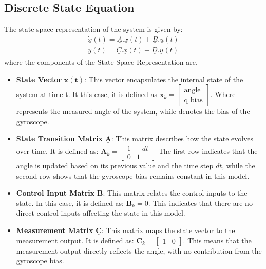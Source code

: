 \begin{appendices}
\subsection{Discrete State Equation}
The state-space representation of the system is given by:
\begin{equation}
	\begin{aligned}
		\underline{\dot{x}}(t) = \underline{A}.\underline{x}(t) + \underline{B}.\underline{u}(t) \\
		\underline{y}(t) = \underline{C}.\underline{x}(t) + \underline{D}.\underline{u}(t)  \label{eq:eq}
	\end{aligned}
\end{equation}
where the components of the State-Space Representation are,
\begin{itemize}
	\item \textbf{State Vector} $\mathbf{\underline{x}(t)}$: This vector encapsulates the internal state of the system at time t. It this case, it is defined as $\mathbf{x}_{k} = \begin{bmatrix} \text{angle} \\ \text{q\_bias} \end{bmatrix}$. Where  represents the measured angle of the system, while  denotes the bias of the gyroscope.
	
	\item \textbf{State Transition Matrix} $\underline{\mathbf{A}}$: This matrix describes how the state evolves over time. It is defined as: $\mathbf{A}_k = \begin{bmatrix} 1 & -dt \\ 0 & 1 \end{bmatrix}$ The first row indicates that the angle is updated based on its previous value and the time step $dt$, while the second row shows that the gyroscope bias remains constant in this model.
	
	\item \textbf{Control Input Matrix} $\underline{\mathbf{B}}$: This matrix relates the control inputs to the state. In this case, it is defined as:
	$\mathbf{B}_k = 0$. This indicates that there are no direct control inputs affecting the state in this model.
	
	\item \textbf{Measurement Matrix} $\underline{\mathbf{C}}$: This matrix maps the state vector to the measurement output. It is defined as: $\mathbf{C}_k = \begin{bmatrix} 1 & 0 \end{bmatrix}$. This means that the measurement output directly reflects the angle, with no contribution from the gyroscope bias.
	

\end{itemize}
\end{appendices}
